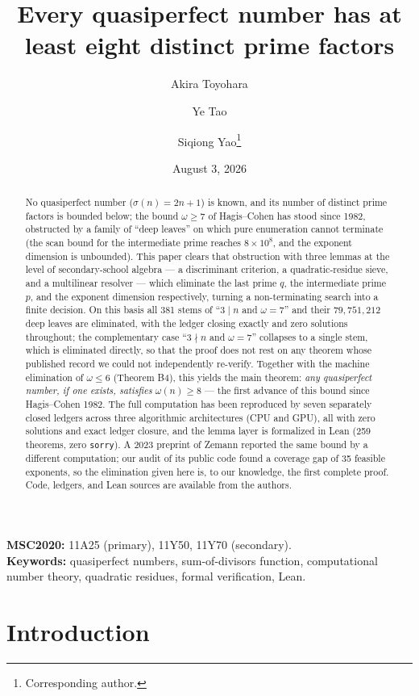 \documentclass[11pt]{article}
\title{Every quasiperfect number has at least eight distinct prime factors}
\author{Akira Toyohara
\and Ye Tao
\and Siqiong Yao\thanks{Corresponding author.}}
\date{August 3, 2026}
\theoremstyle{remark}
\begin{document}
\maketitle

\begin{abstract} No quasiperfect number ($\sigma(n) = 2n + 1$) is known, and its number of distinct prime factors is bounded below; the bound $\omega \ge 7$ of Hagis--Cohen has stood since 1982, obstructed by a family of ``deep leaves'' on which pure enumeration cannot terminate (the scan bound for the intermediate prime reaches $8 \times 10^8$, and the exponent dimension is unbounded). This paper clears that obstruction with three lemmas at the level of secondary-school algebra --- a discriminant criterion, a quadratic-residue sieve, and a multilinear resolver --- which eliminate the last prime $q$, the intermediate prime $p$, and the exponent dimension respectively, turning a non-terminating search into a finite decision. On this basis all 381 stems of ``$3 \mid n$ and $\omega = 7$'' and their $79{,}751{,}212$ deep leaves are eliminated, with the ledger closing exactly and zero solutions throughout; the complementary case ``$3 \nmid n$ and $\omega = 7$'' collapses to a single stem, which is eliminated directly, so that the proof does not rest on any theorem whose published record we could not independently re-verify. Together with the machine elimination of $\omega \le 6$ (Theorem B4), this yields the main theorem: \emph{any quasiperfect number, if one exists, satisfies $\omega(n) \ge 8$} --- the first advance of this bound since Hagis--Cohen 1982. The full computation has been reproduced by seven separately closed ledgers across three algorithmic architectures (CPU and GPU), all with zero solutions and exact ledger closure, and the lemma layer is formalized in Lean (259 theorems, zero \texttt{sorry}). A 2023 preprint of Zemann reported the same bound by a different computation; our audit of its public code found a coverage gap of 35 feasible exponents, so the elimination given here is, to our knowledge, the first complete proof. Code, ledgers, and Lean sources are available from the authors.
\end{abstract}

\noindent\textbf{MSC2020:} 11A25 (primary), 11Y50, 11Y70 (secondary).\\
\textbf{Keywords:} quasiperfect numbers, sum-of-divisors function, computational number theory, quadratic residues, formal verification, Lean.

\section{Introduction}\label{sec:intro}
\end{document}

